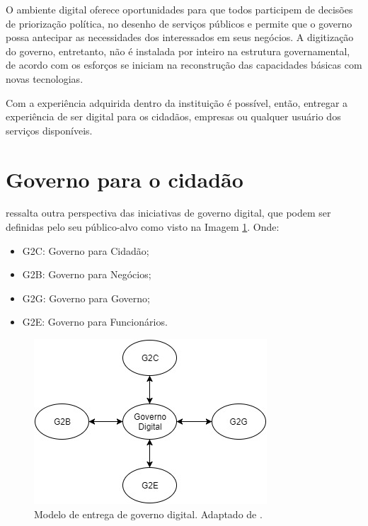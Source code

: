 O ambiente digital oferece oportunidades para que todos participem de decisões de priorização política, no desenho de serviços públicos e permite que o governo possa antecipar as necessidades dos interessados em seus negócios. A digitização do governo, entretanto, não é instalada por inteiro na estrutura governamental, de acordo com \cite{mckinsey2016} os esforços se iniciam na reconstrução das capacidades básicas com novas tecnologias. 

Com a experiência adquirida dentro da instituição é possível, então, entregar a experiência de ser digital para os cidadãos, empresas ou qualquer usuário dos serviços disponíveis.

\section{Governo para o cidadão}

\cite[p.~380]{chen2009} ressalta outra perspectiva das iniciativas de governo digital, que podem ser definidas pelo seu público-alvo como visto na Imagem \ref{img:egovdeliverymodel}. Onde:
\begin{itemize}
	\item G2C: Governo para Cidadão;
	\item G2B: Governo para Negócios;
	\item G2G: Governo para Governo;
	\item G2E: Governo para Funcionários. 
\end{itemize}

\begin{figure}[hbp]
	\centering
	\includegraphics[width=.8\linewidth]{figuras/egovdeliverymodel.jpg}
	\caption{Modelo de entrega de governo digital. Adaptado de \cite{chen2009}.}
	\label{img:egovdeliverymodel}
\end{figure}

